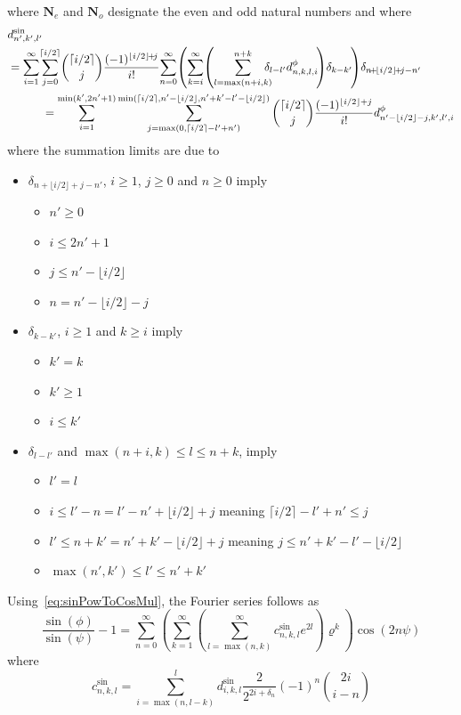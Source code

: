 \documentclass[a4paper]{amsart}
\begin{document}
where $\mathbf{N}_e$ and $\mathbf{N}_o$ designate the even and odd natural numbers and where
\begin{align}
\nonumber &d^{\sin}_{n',k',l'}\\
\nonumber &=\sum_{i=1}^\infty\!\sum_{j=0}^{\lceil i/2\rceil}\!\binom{\lceil i/2\rceil}{j}\frac{(-1)^{\lfloor i/2\rfloor\!+\!j}}{i!}\!\sum_{n=0}^\infty\! \left(\sum_{k=i}^\infty\!\left(\sum_{l=\max(n+i,k)}^{n+k}\!\!\!\!\! \delta_{l-l'}d^\phi_{n,k,l,i}\!\right)\!\delta_{k-k'}\!\right)\!\delta_{n\!+\!\lfloor i/2\rfloor\!+\!j-n'}\\
\raisetag{-9mm}&\quad\quad\quad=\sum_{i=1}^{\min(k',2n'+1)}\sum_{j=\max(0,\lceil i/2\rceil-l'+n')}^{\min(\lceil i/2\rceil,n'-\lfloor i/2\rfloor,n'+k'-l'-\lfloor i/2\rfloor)}\binom{\lceil i/2\rceil}{j}\frac{(-1)^{\lfloor i/2\rfloor+j}}{i!} d^\phi_{n'-\lfloor i/2\rfloor-j,k',l',i}\label{eq:d_sin}
\end{align}
where %
the summation limits are due to
\begin{itemize}
\item $\delta_{n+\lfloor i/2\rfloor+j-n'}$, $i\geq 1$, $j\geq 0$ and $n\geq 0$ imply
\begin{itemize}
\item $n'\geq 0$
\item $i\leq 2n'+1$
\item $j\leq n'-\lfloor i/2\rfloor$
\item $n = n'-\lfloor i/2\rfloor-j$
\end{itemize}
\item $\delta_{k-k'}$, $i\geq 1$ and $k\geq i$ imply
\begin{itemize}
\item $k'=k$
\item $k'\geq 1$
\item $i\leq k'$
\end{itemize}
\item $\delta_{l-l'}$ and $\max(n+i,k)\leq l\leq n+k$, imply
\begin{itemize}
\item $l'=l$
\item $i\leq l'-n= l'-n'+\lfloor i/2\rfloor+j$ meaning $\lceil i/2\rceil-l'+n'\leq j$
\item $l'\leq n + k' = n'+k'-\lfloor i/2\rfloor+j$ meaning $j\leq n'+k'-l'-\lfloor i/2\rfloor$
\item $\max(n',k')\leq l'\leq n'+k'$
\end{itemize}
\end{itemize}
Using~\eqref{eq:sinPowToCosMul}, the Fourier series follows as
\begin{equation}
\frac{\sin(\phi)}{\sin(\psi)}-1=\sum_{n=0}^\infty\left( \sum_{k=1}^\infty\left(\sum_{l=\max(n,k)}^\infty c^{\sin}_{n,k,l}e^{2l}\right)\varrho^k\right)\cos(2n\psi)
\end{equation}
where
\begin{equation}
c^{\sin}_{n,k,l}=\sum_{i=\max(n,l-k)}^l d^{\sin}_{i,k,l}\frac{2}{2^{2i+\delta_n}}(-1)^{n}\binom{2i}{i-n}\label{eq:c_sin}
\end{equation}
\end{document}
